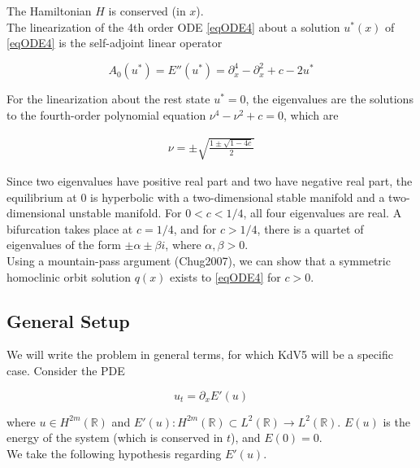 \documentclass[12pt]{article}
\def\R{{\mathbb R}}
\begin{document}
The Hamiltonian $H$ is conserved (in $x$).\\

The linearization of the 4th order ODE \eqref{eqODE4} about a solution $u^*(x)$ of \eqref{eqODE4} is the self-adjoint linear operator

\begin{equation}\label{defA0}
A_0(u^*) = E''(u^*) = \partial_x^4 - \partial_x^2 + c - 2 u^* 
\end{equation}

For the linearization about the rest state $u^* = 0$, the eigenvalues are the solutions to the fourth-order polynomial equation $\nu^4 - \nu^2 + c = 0$, which are

\begin{align}\label{specA0}
\nu = \pm \sqrt{ \frac{1 \pm \sqrt{1 - 4c} }{2}}
\end{align}

Since two eigenvalues have positive real part and two have negative real part, the equilibrium at 0 is hyperbolic with a two-dimensional stable manifold and a two-dimensional unstable manifold. For $0 < c < 1/4$, all four eigenvalues are real. A bifurcation takes place at $c = 1/4$, and for $c > 1/4$, there is a quartet of eigenvalues of the form $\pm \alpha \pm \beta i$, where $\alpha, \beta > 0$.\\

Using a mountain-pass argument (Chug2007), we can show that a symmetric homoclinic orbit solution $q(x)$ exists to \eqref{eqODE4} for $c > 0$.

\subsection{General Setup}

We will write the problem in general terms, for which KdV5 will be a specific case. Consider the PDE

\begin{equation}\label{genPDE}
u_t = \partial_x E'(u)
\end{equation}

where $u \in H^{2m}(\R)$ and $E'(u): H^{2m}(\R) \subset L^2(\R) \rightarrow L^2(\R)$. $E(u)$ is the energy of the system (which is conserved in $t$), and $E(0) = 0$.\\

We take the following hypothesis regarding $E'(u)$.
\end{document}
